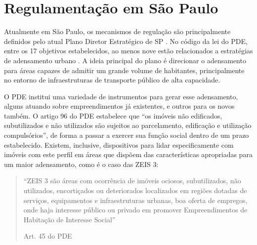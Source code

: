 \begin{figure}[h]
    \caption{Impacto da regulação no CA da cidade}
    \centering
    \begin{subfigure}{.6\linewidth}
        
    \end{subfigure}
    \label{fig:CA}
\end{figure}

\section{Regulamentação em São Paulo}

Atualmente em São Paulo, os mecanismos de regulação são principalmente definidos pelo atual Plano Diretor Estratégico de SP \cite[PDE]{PDE}. No código da lei do PDE, entre os 17 objetivos estabelecidos, ao menos nove estão relacionados a estratégias de adensamento urbano \cite{lima2021alem}. A ideia principal do plano é direcionar o adensamento para áreas capazes de admitir um grande volume de habitantes, principalmente no entorno de infraestruturas de transporte público de alta capacidade.

O PDE institui uma variedade de instrumentos para gerar esse adensamento, alguns atuando sobre empreendimentos já existentes, e outros para os novos também. O artigo 96 do PDE estabelece que ``os imóveis não edificados, subutilizados e não utilizados são sujeitos ao parcelamento, edificação e utilização compulsórios'', de forma a passar a exercer sua função social dentro de um prazo estabelecido. Existem, inclusive, dispositivos para lidar especificamente com imóveis com este perfil em áreas que dispõem das características apropriadas para um maior adensamento, como é o caso das ZEIS 3:

\begin{quotation}
    ``ZEIS 3 são áreas com ocorrência de imóveis ociosos, subutilizados, não utilizados, encortiçados ou deteriorados localizados em regiões dotadas de serviços, equipamentos e infraestruturas urbanas, boa oferta de empregos, onde haja interesse público ou privado em promover Empreendimentos de Habitação de Interesse Social''

    \raggedleft Art. 45 do PDE \cite{PDE}
\end{quotation}

